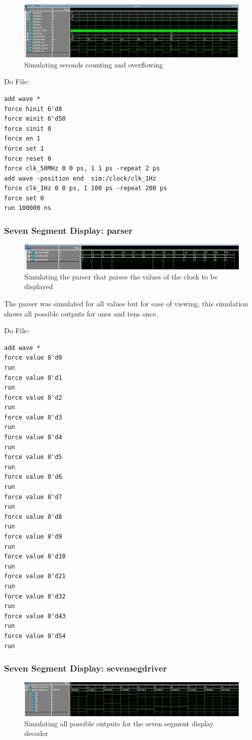 \documentclass[a4paper]{article}
\begin{document}
\begin{figure}[H]
    \includegraphics[width=0.8 \linewidth]{images/clocksim3.JPG}
    \caption{Simulating seconds counting and overflowing}
    \label{clocksim3}
\end{figure}

Do File:
\begin{Verbatim}
add wave *
force hinit 6'd8
force minit 6'd50
force sinit 0
force en 1
force set 1
force reset 0
force clk_50MHz 0 0 ps, 1 1 ps -repeat 2 ps
add wave -position end  sim:/clock/clk_1Hz
force clk_1Hz 0 0 ps, 1 100 ps -repeat 200 ps
force set 0
run 100000 ns

\end{Verbatim}

\subsubsection{Seven Segment Display: parser}
\begin{figure}[H]
    \includegraphics[width=0.8 \linewidth]{images/parsersim.JPG}
    \caption{Simulating the parser that parses the values of the clock to be displayed}
    \label{parsersim}
\end{figure}
The parser was simulated for all values but for ease of viewing, this simulation shows all possible outputs for ones and tens once.

Do File:
\begin{Verbatim}
add wave *
force value 8'd0
run
force value 8'd1
run
force value 8'd2
run
force value 8'd3
run
force value 8'd4
run
force value 8'd5
run
force value 8'd6
run
force value 8'd7
run
force value 8'd8
run
force value 8'd9
run
force value 8'd10
run
force value 8'd21
run
force value 8'd32
run
force value 8'd43
run
force value 8'd54
run

\end{Verbatim}

\subsubsection{Seven Segment Display: sevensegdriver}
\begin{figure}[H]
    \includegraphics[width=0.8 \linewidth]{images/sevensegmentdriversim.JPG}
    \caption{Simulating all possible outputs for the seven segment display decoder}
    \label{sevensegmentdriversim}
\end{figure}
\end{document}
